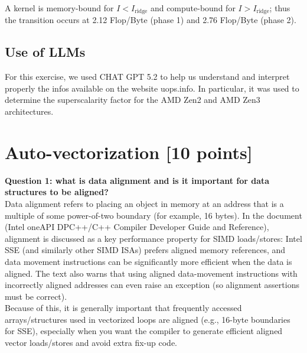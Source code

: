 \documentclass[unicode,10pt,a4paper,oneside,numbers=endperiod,openany]{scrartcl}
\begin{document}
A kernel is memory-bound for 
$I < I_{\text{ridge}}$ and compute-bound for $I > I_{\text{ridge}}$; thus the transition occurs at 2.12 Flop/Byte (phase 1) and 2.76 Flop/Byte (phase 2).

\subsection{Use of LLMs}
For this exercise, we used CHAT GPT 5.2 to help us understand and interpret properly the infos available on the website uops.info. In particular, it was used to determine the superscalarity factor for the AMD Zen2 and AMD Zen3 architectures.\\


\newpage
\section{Auto-vectorization [10 points]}

\textbf{Question 1: what is data alignment and is it important for data structures to be aligned?}\\
Data alignment refers to placing an object in memory at an address that is a multiple of some power-of-two boundary (for example, 16 bytes). In the document (Intel oneAPI DPC++/C++ Compiler Developer Guide and Reference), alignment is discussed as a key performance property for SIMD loads/stores: Intel SSE (and similarly other SIMD ISAs) prefers aligned memory references, and data movement instructions can be significantly more efficient when the data is aligned. The text also warns that using aligned data-movement instructions with incorrectly aligned addresses can even raise an exception (so alignment assertions must be correct).\\
Because of this, it is generally important that frequently accessed arrays/structures used in vectorized loops are aligned (e.g., 16-byte boundaries for SSE), especially when you want the compiler to generate efficient aligned vector loads/stores and avoid extra fix-up code.\\
\end{document}
